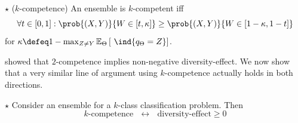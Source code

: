 \documentclass[../main.tex]{subfiles}
\begin{document}
\begin{definition} $\star$ ($k$-competence)
   \label{def:k-competence} 
    An ensemble is $k$-competent iff
$$
\forall t \in [0,1]:
\prob{(X,Y) }{W \in \left[ t, \kappa \right]}
\geq \prob{(X,Y) }{W \in \left[ 1-\kappa, 1-t \right]}
$$
for $ \kappa \defeq 1 - \max_{Z \not= Y} \mathbb{E}_{\Theta}\left[ ~\ind{q_{\Theta} = Z} \right]$.
\end{definition}


\citeauthor{theisen_WhenAreEnsembles_2023} showed that $2$-competence implies non-negative diversity-effect. 
We now show that a very similar line of argument using $k$-competence actually holds in both directions.

\begin{theorem} $\star$ Consider an ensemble for a $k$-class classification problem. Then
$$
\text{$k$-competence}  ~ ~ ~\leftrightarrow~ ~ ~  \text{diversity-effect} \geq 0
$$
\label{thm:k-competence-diversity-effect}
\end{theorem}
\end{document}
